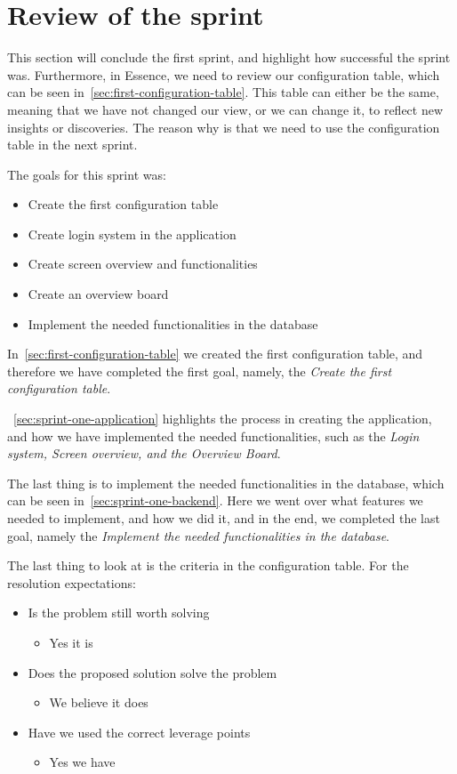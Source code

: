 \section{Review of the sprint}\label{sec:review-sprint-anne}
This section will conclude the first sprint, and highlight how successful the sprint was.
Furthermore, in Essence, we need to review our configuration table, which can be seen in~\autoref{sec:first-configuration-table}.
This table can either be the same, meaning that we have not changed our view, or we can change it, to reflect new insights or discoveries.
The reason why is that we need to use the configuration table in the next sprint.

The goals for this sprint was:

\begin{itemize}
    \item Create the first configuration table 
    \item Create login system in the application
    \item Create screen overview and functionalities
    \item Create an overview board
    \item Implement the needed functionalities in the database
\end{itemize}

In~\autoref{sec:first-configuration-table} we created the first configuration table, and therefore we have completed the first goal, namely, the \textit{Create the first configuration table}.

~\autoref{sec:sprint-one-application} highlights the process in creating the application, and how we have implemented the needed functionalities, such as the \textit{Login system, Screen overview, and the Overview Board}.

The last thing is to implement the needed functionalities in the database, which can be seen in~\autoref{sec:sprint-one-backend}.
Here we went over what features we needed to implement, and how we did it, and in the end, we completed the last goal, namely the \textit{Implement the needed functionalities in the database}.

The last thing to look at is the criteria in the configuration table.
For the resolution expectations:

\begin{itemize}
    \item Is the problem still worth solving
    \begin{itemize}
        \item Yes it is
    \end{itemize}
    \item Does the proposed solution solve the problem
    \begin{itemize}
        \item We believe it does
    \end{itemize}
    \item Have we used the correct leverage points
    \begin{itemize}
        \item Yes we have
    \end{itemize}
\end{itemize}

